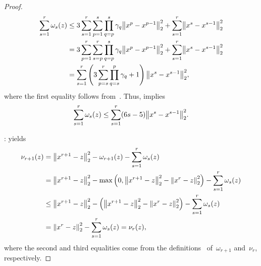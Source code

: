 \documentclass[../main]{subfiles}
\begin{document}
\begin{proof}
\begin{equation}
        \begin{split}
            \sum_{s = 1}^r \omega_s(z)
            &\le 3 \sum_{s = 1}^r \sum_{p = 1}^s \prod_{q = p}^s \gamma_q \norm*{x^p - x^{p - 1}}_2^2 + \sum_{s = 1}^r \norm*{x^s - x^{s - 1}}_2^2 \\
            &= 3 \sum_{p = 1}^r \sum_{s = p}^r \prod_{q = p}^s \gamma_q \norm*{x^p - x^{p - 1}}_2^2 + \sum_{s = 1}^r \norm*{x^s - x^{s - 1}}_2^2 \\
            &= \sum_{s = 1}^r \left( 3 \sum_{p = s}^r \prod_{q = s}^p \gamma_q + 1 \right) \norm*{x^s - x^{s - 1}}_2^2
            ,\end{split}
    \end{equation}
    where the first equality follows from~.
    Thus,  implies
    \begin{equation}
        \sum_{s = 1}^{r} \omega_s(z) \le \sum_{s = 1}^{r} (6 s - 5) \norm*{x^s - x^{s - 1}}_2^2
        .\end{equation}

    :
     yields
    \begin{equation}
        \begin{split}
            \nu_{r + 1}(z) &= \norm*{x^{r + 1} - z}_2^2 - \omega_{r + 1}(z) - \sum_{s = 1}^r \omega_s(z) \\
            &= \norm*{x^{r + 1} - z}_2^2 - \max \left( 0, \norm*{x^{r + 1} - z}_2^2 - \norm*{x^r - z}_2^2 \right) - \sum_{s = 1}^{r} \omega_s(z) \\
            &\le \norm*{x^{r + 1} - z}_2^2 - \left( \norm*{x^{r + 1} - z}_2^2 - \norm*{x^r - z}_2^2 \right) - \sum_{s = 1}^{r} \omega_s(z) \\
            &= \norm*{x^r - z}_2^2 - \sum_{s = 1}^{r} \omega_s(z) = \nu_r(z)
            ,\end{split}
    \end{equation}
    where the second and third equalities come from the definitions~ of~$\omega_{r + 1}$ and~$\nu_r$, respectively.
\end{proof}
\end{document}
